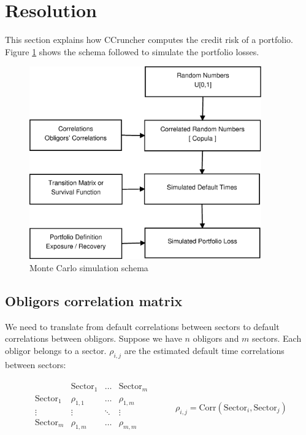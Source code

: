 \documentclass[a4paper,12pt,final]{article}
\begin{document}
\FloatBarrier

\clearpage
\section{Resolution}

This section explains how CCruncher computes the credit risk of a portfolio.
Figure \ref{fig:mcschema1} shows the schema followed to simulate the 
portfolio losses.

\begin{figure}[!hb]
\begin{center}
\includegraphics[width=10cm,angle=0]{./images/esquema1.eps}
\caption{Monte Carlo simulation schema}
\label{fig:mcschema1}
\end{center}
\end{figure}

\subsection{Obligors correlation matrix}
\label{tcorrel}
We need to translate from default correlations between sectors to default 
correlations between obligors. Suppose we have $n$ obligors and $m$ 
sectors. Each obligor belongs to a sector. $\rho_{i,j}$ are the estimated 
default time correlations between sectors:

\begin{center}
\begin{displaymath}
\begin{array}{cc}
\begin{array}{c|ccc}
                    & \mathrm{Sector}_1 & \dots  & \mathrm{Sector}_{m} \\
\hline
\mathrm{Sector}_1   & \rho_{1,1}        & \dots  & \rho_{1,m} \\
\vdots              & \vdots            & \ddots & \vdots     \\
\mathrm{Sector}_{m} & \rho_{1,m}        & \dots  & \rho_{m,m} \\
\end{array}
&
\qquad \rho_{i,j} = \mathrm{Corr}(\mathrm{Sector}_i, \mathrm{Sector}_j)
\end{array}
\end{displaymath}
\end{center}
\end{document}
